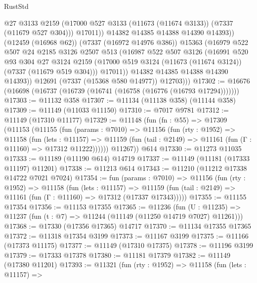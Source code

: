 \begin{lexlean}{RustStd}
\begin{coremodule}
                    @27
                    @3133
                    @2159
                    (@17000 @527 @3133 (@11673 (@11674 @3133)) (@7337 (@11679 @527 @304)))
                    @17011))
                @14382
                @14385
                @14388
                @14390
                @14393))
            (@12459 (@16968 @62))
            (@7337 (@16972 @14976 @386))
            @15363
            (@16979
              @522
              @507
              @24
              @2185
              @3126
              @2507
              @513
              (@16987
                @522
                @507
                @3126
                (@16991
                  @520
                  @93
                  @304
                  @27
                  @3124
                  @2159
                  (@17000 @519 @3124 (@11673 (@11674 @3124)) (@7337 (@11679 @519 @304)))
                  @17011))
              @14382
              @14385
              @14388
              @14390
              @14393))
          @12691
          (@7337 (@15368 @580 @14977))
          @12703)))
@17302 := @16676 (@16698 (@16737 (@16739 (@16741 (@16758 (@16776 (@16793 @17294)))))))
@17303 := @11132 @358
@17307 := @11134 (@11138 @358) (@11144 @358)
@17309 := @11149 (@11033 @11150)
@17310 := @7017 @9781
@17312 := @11149 (@17310 @11177)
@17329 := @11148
    (fun (fn : @55) =>
    @17309
      (@11153
        (@11155
          (fun (params : @7010) =>
          @11156
            (fun (rty : @1952) =>
            @11158
              (fun (lets : @11157) =>
              @11159 (fun (tail : @2149) => @11161 (fun (Γ : @11160) => @17312 @11222))))))
        @11267))
    @614
@17330 := @11273 @11035
@17333 := @11189 (@11190 @614) @14719
@17337 := @11149 (@11181 (@17333 @11197) @11201)
@17338 := @11213 @614
@17343 := @11210 (@11212 @17338 @14722 @7021 @7024)
@17354 := fun (params : @7010) =>
  @11156
    (fun (rty : @1952) =>
    @11158
      (fun (lets : @11157) =>
      @11159 (fun (tail : @2149) => @11161 (fun (Γ : @11160) => @17312 (@17337 @17343)))))
@17355 := @11155 @17354
@17356 := @11153 @17355
@17365 := @11236
    (fun (U : @11235) => @11237 (fun (t : @7) => @11244 (@11149 (@11250 @14719 @7027) @11261)))
@17368 := @17330 (@17356 @17365) @14717
@17370 := @11134 @17355 @17365
@17372 := @11318 @17354 @3199
@17373 := @11167 @3199
@17375 := @11166 (@17373 @11175)
@17377 := @11149 (@17310 @17375)
@17378 := @11196 @3199
@17379 := @17333 @17378
@17380 := @11181 @17379
@17382 := @11149 (@17380 @11201)
@17393 := @11321
    (fun (rty : @1952) =>
    @11158
      (fun (lets : @11157) =>

\end{coremodule}
\end{lexlean}
